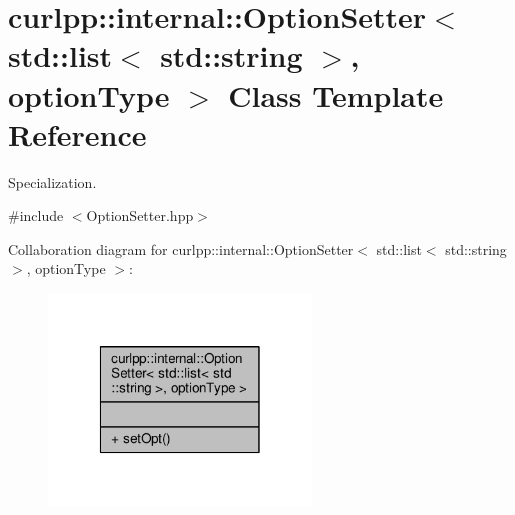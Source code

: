\hypertarget{classcurlpp_1_1internal_1_1OptionSetter_3_01std_1_1list_3_01std_1_1string_01_4_00_01optionType_01_4}{\section{curlpp\-:\-:internal\-:\-:Option\-Setter$<$ std\-:\-:list$<$ std\-:\-:string $>$, option\-Type $>$ Class Template Reference}
\label{classcurlpp_1_1internal_1_1OptionSetter_3_01std_1_1list_3_01std_1_1string_01_4_00_01optionType_01_4}
}


Specialization.  




{\ttfamily \#include $<$Option\-Setter.\-hpp$>$}



Collaboration diagram for curlpp\-:\-:internal\-:\-:Option\-Setter$<$ std\-:\-:list$<$ std\-:\-:string $>$, option\-Type $>$\-:\nopagebreak
\begin{figure}[H]
\begin{center}
\leavevmode
\includegraphics[width=198pt]{classcurlpp_1_1internal_1_1OptionSetter_3_01std_1_1list_3_01std_1_1string_01_4_00_01optionType_01_4__coll__graph}
\end{center}
\end{figure}

